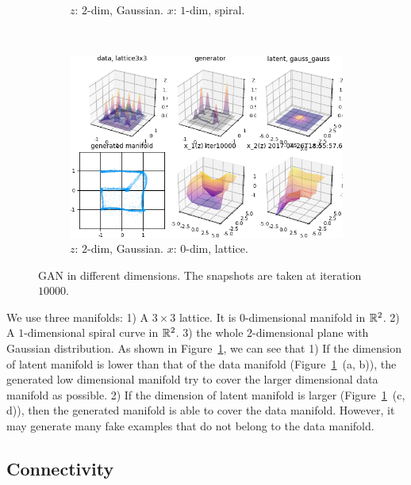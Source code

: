 \begin{figure}[ht]
\begin{subfigure}[t]{0.45\textwidth}
        \caption{$z$: $2$-dim, Gaussian.
            $x$: $1$-dim, spiral.}
    \end{subfigure}
    ~
    \begin{subfigure}[t]{0.45\textwidth}
        \includegraphics[width=\linewidth]{"fig/gaussgauss_lattice3x3_000100"}
        \caption{$z$: $2$-dim, Gaussian.
            $x$: $0$-dim, lattice.}
    \end{subfigure}
    \caption{\small
        GAN in different dimensions.
        The snapshots are taken at iteration $10000$.
        }
    \label{fig:dim}
\end{figure}

We use three manifolds:
1) A $3\times3$ lattice. It is $0$-dimensional manifold in ${\mathbb{R}}^2$.
2) A $1$-dimensional spiral curve in ${\mathbb{R}}^2$.
3) the whole $2$-dimensional plane with Gaussian distribution.
As shown in Figure~\ref{fig:dim},
we can see that
1) If the dimension of latent manifold is lower than that of the data manifold
(Figure~\ref{fig:dim}~(a, b)),
the generated low dimensional manifold try to cover the
larger dimensional data manifold as possible.
2) If the dimension of latent manifold is larger (Figure~\ref{fig:dim}~(c, d)),
then the generated manifold is able to cover the data manifold.
However,
it may generate many fake examples that do not belong to the data manifold.

\subsection{Connectivity}

